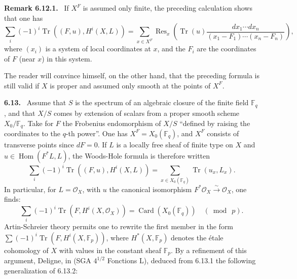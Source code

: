 \documentclass[11pt]{article}
\newenvironment{statement}[1]{\par\medskip\noindent\textbf{#1.}\ }{\par\medskip}
\DeclareMathOperator{\Hom}{Hom}
\providecommand{\Tr}{\operatorname{Tr}}
\providecommand{\OO}{\mathcal O}
\providecommand{\Res}{\operatorname{Res}}
\providecommand{\Card}{\operatorname{Card}}
\begin{document}
\begin{statement}{Remark 6.12.1}
If $X^F$ is assumed only finite, the preceding calculation shows that one has
\[
\sum_i(-1)^i\Tr((F,u),H^i(X,L))=
\sum_{x\in X^F}\Res_x\left(\Tr(u)\frac{dx_1\cdots dx_n}{(x_1-F_1)\cdots(x_n-F_n)}\right),
\]
where $(x_i)$ is a system of local coordinates at $x$, and the $F_i$ are the coordinates of $F$ (near $x$) in this system.

The reader will convince himself, on the other hand, that the preceding formula is still valid if $X$ is proper and assumed only smooth at the points of $X^F$.
\end{statement}

\begin{statement}{6.13}
Assume that $S$ is the spectrum of an algebraic closure of the finite field $\mathbb F_q$, and that $X/S$ comes by extension of scalars from a proper smooth scheme $X_0/\mathbb F_q$. Take for $F$ the Frobenius endomorphism of $X/S$ ``defined by raising the coordinates to the $q$-th power''. One has $X^F=X_0(\mathbb F_q)$, and $X^F$ consists of transverse points since $dF=0$. If $L$ is a locally free sheaf of finite type on $X$ and $u\in\Hom(F^*L,L)$, the Woods-Hole formula is therefore written
\begin{equation}
\tag{6.13.1}
\sum_i(-1)^i\Tr((F,u),H^i(X,L))=
\sum_{x\in X_0(\mathbb F_q)}\Tr(u_x,L_x).
\end{equation}
In particular, for $L=\OO_X$, with $u$ the canonical isomorphism $F^*\OO_X\xrightarrow{\sim}\OO_X$, one finds:
\begin{equation}
\tag{6.13.2}
\sum_i(-1)^i\Tr(F,H^i(X,\OO_X))=\Card(X_0(\mathbb F_q))\quad (\bmod\ p).
\end{equation}
Artin-Schreier theory permits one to rewrite the first member in the form $\sum(-1)^i\Tr(F,H^i(X,\mathbb F_p))$, where $H^*(X,\mathbb F_p)$ denotes the étale cohomology of $X$ with values in the constant sheaf $\mathbb F_p$. By a refinement of this argument, Deligne, in (SGA $4^{1/2}$ Fonctions L), deduced from 6.13.1 the following generalization of 6.13.2:
\end{statement}
\end{document}

